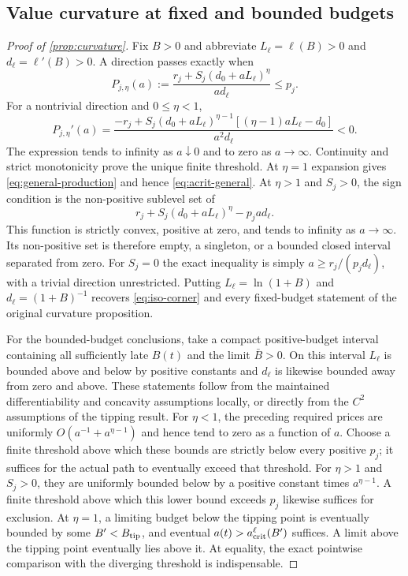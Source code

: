 \documentclass[11pt,a4paper]{article}
\theoremstyle{definition}\newtheorem{definition}{Definition}
\begin{document}
\subsection{Value curvature at fixed and bounded budgets}
\label{app:curvature-proof}
\begin{proof}[Proof of \cref{prop:curvature}]
Fix $B>0$ and abbreviate $L_\ell=\ell(B)>0$ and
$d_\ell=\ell'(B)>0$. A direction passes exactly when
\[
 P_{j,\eta}(a):=\frac{r_j+S_j(d_0+aL_\ell)^\eta}{a d_\ell}
 \leq p_j.
\]
For a nontrivial direction and $0\leq\eta<1$,
\[
 P_{j,\eta}'(a)=\frac{-r_j+S_j(d_0+aL_\ell)^{\eta-1}
                    [(\eta-1)aL_\ell-d_0]}{a^2d_\ell}<0.
\]
The expression tends to infinity as $a\downarrow0$ and to zero as
$a\to\infty$. Continuity and strict monotonicity prove the unique
finite threshold. At $\eta=1$ expansion gives
\cref{eq:general-production} and hence \cref{eq:acrit-general}.
At $\eta>1$ and $S_j>0$, the sign condition is the non-positive
sublevel set of
\[
 r_j+S_j(d_0+aL_\ell)^\eta-p_ja d_\ell.
\]
This function is strictly convex, positive at zero, and tends to
infinity as $a\to\infty$. Its non-positive set is therefore empty,
a singleton, or a bounded closed interval separated from zero.
For $S_j=0$ the exact inequality is simply
$a\geq r_j/(p_jd_\ell)$, with a trivial direction unrestricted.
Putting $L_\ell=\ln(1+B)$ and $d_\ell=(1+B)^{-1}$ recovers
\cref{eq:iso-corner} and every fixed-budget statement of the original
curvature proposition.

For the bounded-budget conclusions, take a compact positive-budget
interval containing all sufficiently late $B(t)$ and the limit
$\bar B>0$. On this interval $L_\ell$ is bounded above and below by
positive constants and $d_\ell$ is likewise bounded away from zero
and above. These statements follow from the maintained differentiability
and concavity assumptions locally, or directly from the $C^2$ assumptions
of the tipping result. For $\eta<1$, the preceding required prices
are uniformly $O(a^{-1}+a^{\eta-1})$ and hence tend to zero as a
function of $a$. Choose a finite threshold above which these bounds are
strictly below every positive $p_j$; it suffices for the actual path to
eventually exceed that threshold. For $\eta>1$ and $S_j>0$, they are
uniformly bounded below by a positive constant times $a^{\eta-1}$.
A finite threshold above which this lower bound exceeds $p_j$ likewise
suffices for exclusion. At $\eta=1$, a limiting budget below the tipping
point is eventually bounded by some $B'<B_{\rm tip}$, and eventual
$a(t)>a_{\rm crit}^{\ell}(B')$ suffices. A limit above the tipping point
eventually lies above it.
At equality, the exact pointwise comparison with the diverging
threshold is indispensable.
\end{proof}
\end{document}
